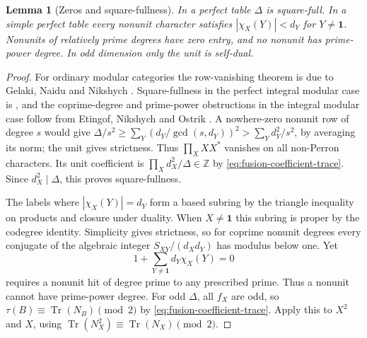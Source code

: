 \documentclass[11pt,a4paper]{article}
\numberwithin{equation}{section}
\newtheorem{lemma}[theorem]{Lemma}
\theoremstyle{remark}
\newcommand{\one}{\mathbf1}
\newcommand{\ZZ}{\mathbb Z}
\newcommand{\Tr}{\operatorname{Tr}}
\begin{document}
\begin{lemma}[Zeros and square-fullness]\label{lem:tables}
In a perfect table $\Delta$ is square-full. In a simple perfect table every nonunit character satisfies $|\chi_X(Y)|<d_Y$ for $Y\ne\one$.
Nonunits of relatively prime degrees have zero entry, and no nonunit has prime-power degree.
In odd dimension only the unit is self-dual.
\end{lemma}\begin{proof}
For ordinary modular categories the row-vanishing theorem is due to
Gelaki, Naidu and Nikshych \cite[Theorem~6.1]{GNNcenters}.
Square-fullness in the perfect integral modular case is
\cite[Corollary~10.10]{BP}, and the coprime-degree and prime-power
obstructions in the integral modular case follow from
Etingof, Nikshych and Ostrik \cite[Lemma~7.1 and Corollary~7.2]{ENOsolvable}.
A nowhere-zero nonunit row of degree $s$ would give
$\Delta/s^2\ge\sum_Y(d_Y/\gcd(s,d_Y))^2>\sum_Yd_Y^2/s^2$, by averaging its norm; the unit gives strictness.
Thus $\prod_X XX^*$ vanishes on all non-Perron characters. Its unit coefficient is $\prod_X d_X^2/\Delta\in\ZZ$ by \eqref{eq:fusion-coefficient-trace}. Since $d_X^2\mid\Delta$, this proves square-fullness.

The labels where $|\chi_X(Y)|=d_Y$ form a based subring by the triangle inequality on products and closure under duality. When $X\ne\one$ this subring is proper by the codegree identity. Simplicity gives strictness, so for coprime nonunit degrees every conjugate of the algebraic integer $S_{XY}/(d_Xd_Y)$ has modulus below one. Yet
\begin{equation}
 1+\sum_{Y\ne\one}d_Y\chi_X(Y)=0
\end{equation}
requires a nonunit hit of degree prime to any prescribed prime. Thus a nonunit cannot have prime-power degree.
For odd $\Delta$, all $f_X$ are odd, so $\tau(B)\equiv\Tr(N_B)\pmod2$ by \eqref{eq:fusion-coefficient-trace}. Apply this to $X^2$ and $X$, using $\Tr(N_X^2)\equiv\Tr(N_X)\pmod2$.
\end{proof}
\end{document}
